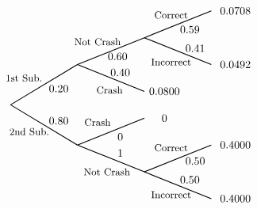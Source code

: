 \documentclass[11pt,letterpaper]{article}
\begin{document}
		\[
		\begin{tikzpicture}[scale= 0.85]
		\def\FirstUpLabel{\small 1st Sub.}
		\def\FirstDownLabel{\small 2nd Sub.}
		\def\SecondUpLabel{\small Not Crash}
		\def\SecondDownLabel{\small Crash}
		\def\Up{$0.20$}
		\def\Down{$0.80$}
		\def\UpUp{$0.60$}
		\def\UpDown{$0.40$}
		\def\DownUp{$0$}
		\def\DownDown{$1$}
		\def\first{$0.0664$}
		\def\second{$0.0800$}
		\def\third{$0$}
		\def\fourth{$0.5612$}
		
		\node at (0.5,1) {\FirstUpLabel};	
		\node at (0.7,-1) {\FirstDownLabel};	
		\node at (1.8,0.6) {\Up};
		\node at (1.8,-0.6) {\Down};
		\draw[thick] (0,0) -- (2.5,1.5);
		\draw[thick] (0,0) -- (2.5,-1.5);
		
		\node at (3.25,2.35) {\SecondUpLabel};
		\node at (3.7,0.55) {\SecondDownLabel};
		\node at (4,1.8) {\UpUp};
		\node at (4.1,1.2) {\UpDown};
		\node at (5.75,0.5) {\second};
		\draw[thick] (2.5,1.5) -- (5,2.5);
		\draw[thick] (2.5,1.5) -- (5,0.5);
		
		\draw[thick] (5,2.5) -- (7.5,3.5);
		\draw[thick] (5,2.5) -- (7.5,1.5);
		\node at (6,3.35) {\small Correct};
		\node at (6.7,2.8) {$0.59$};
		\node at (6,1.6) {\small Incorrect};
		\node at (6.9,2.1) {$0.41$};
		\node at (8.4,3.5) {$0.0708$};
		\node at (8.4,1.5) {$0.0492$};

		\node at (3.25,-0.65) {\small Crash};
		\node at (3.6,-2.5) {\small Not Crash};
		\node at (4.1,-1.2) {\DownUp};
		\node at (4.1,-1.8) {\DownDown};
		\node at (5.75,-0.5) {\third};	
		\draw[thick] (2.5,-1.5) -- (5,-0.5);
		\draw[thick] (2.5,-1.5) -- (5,-2.5);
		
		\draw[thick] (5,-2.5) -- (7.5,-1.5);
		\draw[thick] (5,-2.5) -- (7.5,-3.5);
		\node at (6,-3.35) {\small Incorrect};
		\node at (6.7,-2.8) {$0.50$};
		\node at (6,-1.6) {\small Correct};
		\node at (6.9,-2.1) {$0.50$};
		\node at (8.4,-1.5) {$0.4000$};
		\node at (8.4,-3.5) {$0.4000$};		
		\end{tikzpicture}
		\]



\newpage
\end{document}
